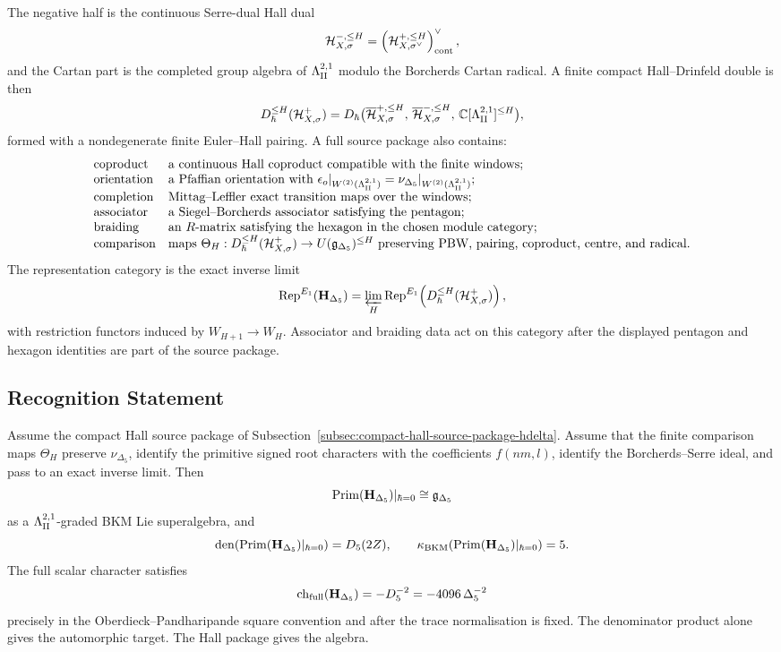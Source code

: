 The negative half is the continuous Serre-dual Hall dual
\[
  \mathcal H^{-,\le H}_{X,\sigma}
  =
  \left(\mathcal H^{+,\le H}_{X,\sigma^\vee}\right)^\vee_{\mathrm{cont}},
\]
and the Cartan part is the completed group algebra of \(\Lambda^{2,1}_{\mathrm{II}}\) modulo
the Borcherds Cartan radical.  A finite compact Hall--Drinfeld double
is then
\[
  D^{\le H}_\hbar(\mathcal H^+_{X,\sigma})
  =
  D_\hbar
  \bigl(
    \overline{\mathcal H}^{+,\le H}_{X,\sigma},\,
    \overline{\mathcal H}^{-,\le H}_{X,\sigma},\,
    \mathbb C[\Lambda^{2,1}_{\mathrm{II}}]^{\le H}
  \bigr),
\]
formed with a nondegenerate finite Euler--Hall pairing.  A full source
package also contains:
\[
\begin{array}{ll}
\text{coproduct} &
  \text{a continuous Hall coproduct compatible with the finite windows;}\\
\text{orientation} &
  \text{a Pfaffian orientation with }
  \epsilon_o|_{W^{(2)}(\Lambda^{2,1}_{\mathrm{II}})}=\nu_{\Delta_5}|_{W^{(2)}(\Lambda^{2,1}_{\mathrm{II}})};\\
\text{completion} &
  \text{Mittag--Leffler exact transition maps over the windows;}\\
\text{associator} &
  \text{a Siegel--Borcherds associator satisfying the pentagon;}\\
\text{braiding} &
  \text{an \(R\)-matrix satisfying the hexagon in the chosen module category;}\\
\text{comparison} &
  \text{maps \(\Theta_H:D^{\le H}_\hbar(\mathcal H^+_{X,\sigma})
  \to U(\mathfrak g_{\Delta_5})^{\le H}\) preserving PBW, pairing, coproduct,
  centre, and radical.}
\end{array}
\]
The representation category is the exact inverse limit
\[
  \mathrm{Rep}^{E_1}(\mathbf H_{\Delta_5})
  =
  \varprojlim_H
  \mathrm{Rep}^{E_1}\!\left(D^{\le H}_\hbar(\mathcal H^+_{X,\sigma})\right),
\]
with restriction functors induced by \(W_{H+1}\to W_H\).  Associator
and braiding data act on this category after the displayed pentagon and
hexagon identities are part of the source package.

\subsection{Recognition Statement}
\label{subsec:hdelta5-recognition-statement}

Assume the compact Hall source package of
Subsection~\ref{subsec:compact-hall-source-package-hdelta}.  Assume
that the finite comparison maps \(\Theta_H\) preserve
\(\nu_{\Delta_5}\), identify the primitive signed root characters with
the coefficients \(f(nm,l)\), identify the Borcherds--Serre ideal, and
pass to an exact inverse limit.  Then
\[
  \mathrm{Prim}(\mathbf H_{\Delta_5})|_{\hbar=0}
  \cong
  \mathfrak g_{\Delta_5}
\]
as a \(\Lambda^{2,1}_{\mathrm{II}}\)-graded BKM Lie superalgebra, and
\[
  \operatorname{den}(\mathrm{Prim}(\mathbf H_{\Delta_5})|_{\hbar=0})
  =
  D_5(2Z),
  \qquad
  \kappa_{\mathrm{BKM}}(\mathrm{Prim}(\mathbf H_{\Delta_5})|_{\hbar=0})=5.
\]
The full scalar character satisfies
\[
  \operatorname{ch}_{\mathrm{full}}(\mathbf H_{\Delta_5})
  =
  -D_5^{-2}
  =
  -4096\,\Delta_5^{-2}
\]
precisely in the Oberdieck--Pandharipande square convention and after
the trace normalisation is fixed.  The denominator product alone gives
the automorphic target.  The Hall package gives the algebra.

